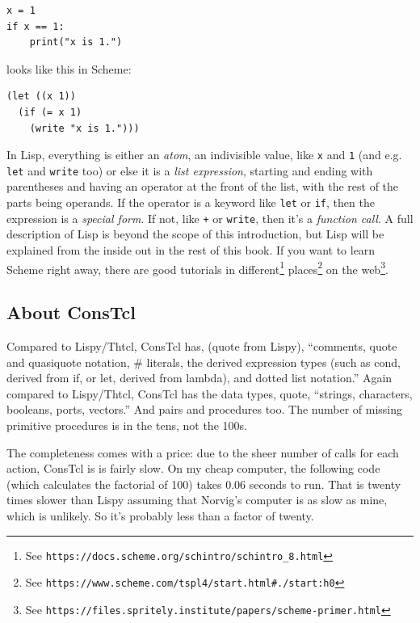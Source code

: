 \documentclass[twoside,9pt]{report}
\begin{document}
\begin{verbatim}
x = 1
if x == 1:
    print("x is 1.")
\end{verbatim}

\noindent looks like this in Scheme:

\begin{verbatim}
(let ((x 1))
  (if (= x 1)
    (write "x is 1.")))
\end{verbatim}

In Lisp, everything is either an \emph{atom}, an indivisible value, like
\texttt{x} and \texttt{1} (and e.g. \texttt{let} and \texttt{write} too) or
else it is a \emph{list expression}, starting and ending with parentheses and
having an operator at the front of the list, with the rest of the parts being
operands. If the operator is a keyword like \texttt{let} or \texttt{if}, then
the expression is a \emph{special form}. If not, like \texttt{+} or
\texttt{write}, then it's a \emph{function call}.  A full description of Lisp
is beyond the scope of this introduction, but Lisp will be explained from the
inside out in the rest of this book. If you want to learn Scheme right away, there are good tutorials in different\footnote{See \texttt{https://docs.scheme.org/schintro/schintro\_8.html}} places\footnote{See \texttt{https://www.scheme.com/tspl4/start.html\#./start:h0}} on the web\footnote{See \texttt{https://files.spritely.institute/papers/scheme-primer.html}}.

\subsection{About ConsTcl}
\label{about-constcl}

Compared to Lispy/Thtcl, ConsTcl has, (quote from Lispy), ``comments, quote and
quasiquote notation, \# literals, the derived expression types (such as cond,
derived from if, or let, derived from lambda), and dotted list notation.''
Again compared to Lispy/Thtcl, ConsTcl has the data types, quote, ``strings,
characters, booleans, ports, vectors.'' And pairs and procedures too. The
number of missing primitive procedures is in the tens, not the 100s. 

The completeness comes with a price: due to the sheer number of calls for each
action, ConsTcl is is fairly slow. On my cheap computer, the following code
(which calculates the factorial of 100) takes 0.06 seconds to run. That is twenty
times slower than Lispy assuming that Norvig's computer is as slow as mine,
which is unlikely. So it's probably less than a factor of twenty.
\end{document}
